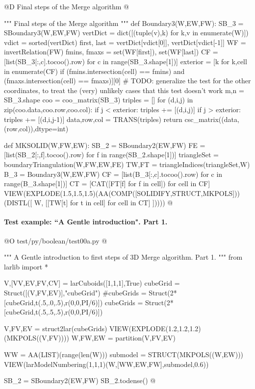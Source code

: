 \documentclass[11pt,oneside]{article}    %
\begin{document}
@D Final steps of the Merge algorithm
@{""" Final steps of the Merge algorithm """  
def Boundary3(W,EW,FW):
	SB_3 = SBoundary3(W,EW,FW)
	vertDict = dict([(tuple(v),k) for k,v in enumerate(W)])
	vdict = sorted(vertDict)
	first, last = vertDict[vdict[0]], vertDict[vdict[-1]]
	WF = invertRelation(FW)
	fmins, fmaxs = set(WF[first]), set(WF[last])
	CF = [list(SB_3[:,c].tocoo().row) for c in range(SB_3.shape[1])]
	exterior = [k for k,cell in enumerate(CF) if (fmins.intersection(cell) == fmins) 
		and (fmaxs.intersection(cell) == fmaxs)][0]
	# TODO: generalize the test for the other coordinates, to treat the (very) unlikely cases that this test doesn't work
	m,n = SB_3.shape
	coo = coo_matrix(SB_3)
	triples = []
	for (d,i,j) in zip(coo.data,coo.row,coo.col):
		if j < exterior:
			triples += [(d,i,j)]
		if j > exterior:
			triples += [(d,i,j-1)]
	data,row,col = TRANS(triples)
	return csc_matrix((data,(row,col)),dtype=int)

def MKSOLID(W,FW,EW):
	SB_2 = SBoundary2(EW,FW)
	FE = [list(SB_2[:,f].tocoo().row) for f in range(SB_2.shape[1])]
	triangleSet = boundaryTriangulation(W,FW,EW,FE)
	TW,FT = triangleIndices(triangleSet,W)
	B_3 = Boundary3(W,EW,FW)
	CF = [list(B_3[:,c].tocoo().row) for c in range(B_3.shape[1])]
	CT = [CAT([FT[f] for f in cell]) for cell in CF] 
	VIEW(EXPLODE(1.5,1.5,1.5)(AA(COMP([SOLIDIFY,STRUCT,MKPOLS]))(DISTL([ W, 
		[[TW[t] for t in cell] for cell in CT] ]))))
@}


\paragraph{Test example: ``A Gentle introduction". Part 1.}
@O test/py/boolean/test00a.py
@{""" A Gentle introduction to first steps of 3D Merge algorithm. Part 1. """
from larlib import *

V,[VV,EV,FV,CV] = larCuboids([1,1,1],True)
cubeGrid = Struct([(V,FV,EV)],"cubeGrid")
#cubeGrids = Struct(2*[cubeGrid,t(.5,.0,.5),r(0,0,PI/6)])
cubeGrids = Struct(2*[cubeGrid,t(.5,.5,.5),r(0,0,PI/6)])

V,FV,EV = struct2lar(cubeGrids)
VIEW(EXPLODE(1.2,1.2,1.2)(MKPOLS((V,FV))))
W,FW,EW = partition(V,FV,EV)

WW = AA(LIST)(range(len(W)))
submodel = STRUCT(MKPOLS((W,EW)))
VIEW(larModelNumbering(1,1,1)(W,[WW,EW,FW],submodel,0.6)) 

SB_2 = SBoundary2(EW,FW)
SB_2.todense()
@}
\end{document}
